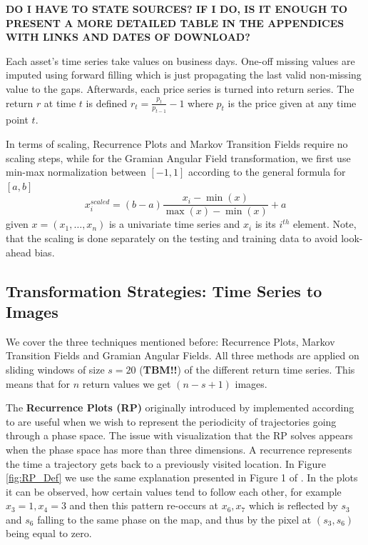 \documentclass[11pt, a4paper]{article}
\begin{document}
\textbf{DO I HAVE TO STATE SOURCES? IF I DO, IS IT ENOUGH TO PRESENT A MORE DETAILED TABLE IN THE APPENDICES WITH LINKS AND DATES OF DOWNLOAD?}

Each asset's time series take values on business days. One-off missing values are imputed using forward filling which is just propagating the last valid non-missing value to the gaps. Afterwards, each price series is turned into return series. The return $r$ at time $t$ is defined $r_t = \frac{p_t}{p_{t-1}}-1$ where $p_t$ is the price given at any time point $t$.

In terms of scaling, Recurrence Plots and Markov Transition Fields require no scaling steps, while for the Gramian Angular Field transformation, we first use min-max normalization between $[-1, 1]$ according to the general formula for $[a, b]$
\begin{equation}
\label{eq:minmax}
    x^{scaled}_i =(b-a)\frac{x_i-\min(x)}{\max(x) - \min(x)} + a
\end{equation}
given $x = (x_1, \dots, x_n)$ is a univariate time series and $x_i$ is its $i^{th}$ element. Note, that the scaling is done separately on the testing and training data to avoid look-ahead bias.

\subsection{Transformation Strategies: Time Series to Images}
\label{subsec:DM:TS2IM}

We cover the three techniques mentioned before: Recurrence Plots, Markov Transition Fields and Gramian Angular Fields. All three methods are applied on sliding windows of size $s = 20$ (\textbf{TBM!!}) of the different return time series. This means that for $n$ return values we get $(n - s + 1)$ images. 

The \textbf{Recurrence Plots (RP)} originally introduced by \cite{jp1987recurrence} implemented according to \cite{hatami2018classification} are useful when we wish to represent the periodicity of trajectories going through a phase space. The issue with visualization that the RP solves appears when the phase space has more than three dimensions. A recurrence represents the time a trajectory gets back to a previously visited location. In Figure \ref{fig:RP_Def} we use the same explanation presented in Figure 1 of \cite{hatami2018classification}. In the plots it can be observed, how certain values tend to follow each other, for example $x_3 = 1, x_4 = 3$ and then this pattern re-occurs at $x_6, x_7$ which is reflected by $s_3$ and $s_6$ falling to the same phase on the map, and thus by the pixel at $(s_3, s_6)$ being equal to zero.
\end{document}
